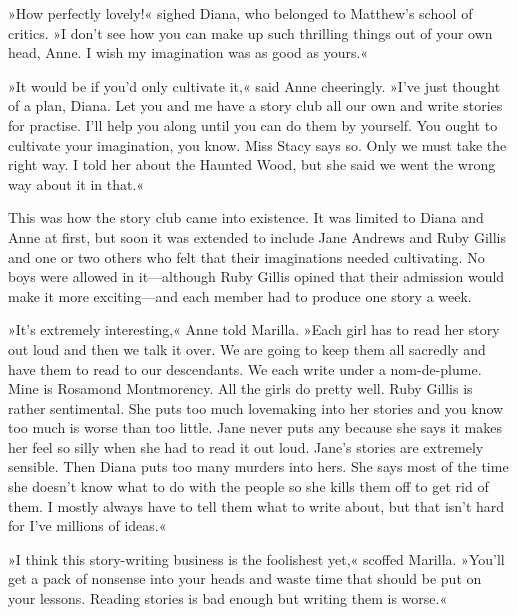 »How perfectly lovely!« sighed Diana, who belonged to Matthew's school of critics. »I don't see how you can make up such thrilling things out of your own head, Anne. I wish my imagination was as good as yours.«

»It would be if you'd only cultivate it,« said Anne cheeringly. »I've just thought of a plan, Diana. Let you and me have a story club all our own and write stories for practise. I'll help you along until you can do them by yourself. You ought to cultivate your imagination, you know. Miss Stacy says so. Only we must take the right way. I told her about the Haunted Wood, but she said we went the wrong way about it in that.«

This was how the story club came into existence. It was limited to Diana and Anne at first, but soon it was extended to include Jane Andrews and Ruby Gillis and one or two others who felt that their imaginations needed cultivating. No boys were allowed in it—although Ruby Gillis opined that their admission would make it more exciting—and each member had to produce one story a week.

»It's extremely interesting,« Anne told Marilla. »Each girl has to read her story out loud and then we talk it over. We are going to keep them all sacredly and have them to read to our descendants. We each write under a nom-de-plume. Mine is Rosamond Montmorency. All the girls do pretty well. Ruby Gillis is rather sentimental. She puts too much lovemaking into her stories and you know too much is worse than too little. Jane never puts any because she says it makes her feel so silly when she had to read it out loud. Jane's stories are extremely sensible. Then Diana puts too many murders into hers. She says most of the time she doesn't know what to do with the people so she kills them off to get rid of them. I mostly always have to tell them what to write about, but that isn't hard for I've millions of ideas.«

»I think this story-writing business is the foolishest yet,« scoffed Marilla. »You'll get a pack of nonsense into your heads and waste time that should be put on your lessons. Reading stories is bad enough but writing them is worse.«

